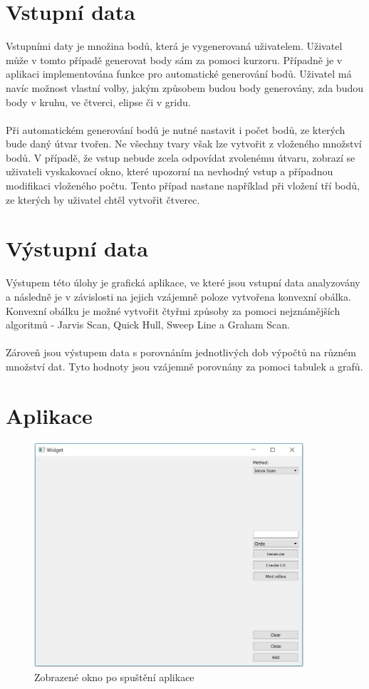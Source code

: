 \documentclass[a4paper, 12pt]{article}
\begin{document}
\section{Vstupní data}
Vstupními daty je množina bodů, která je vygenerovaná uživatelem. Uživatel může v tomto případě generovat body sám za pomoci kurzoru. Případně je v aplikaci implementována funkce pro automatické generování bodů. Uživatel má navíc možnost vlastní volby, jakým způsobem budou body generovány, zda budou body v kruhu, ve čtverci, elipse či v gridu. \\
\\
Při automatickém generování bodů je nutné nastavit i počet bodů, ze kterých bude daný útvar tvořen. Ne všechny tvary však lze vytvořit z vloženého množství bodů. V případě, že vstup nebude zcela odpovídat zvolenému útvaru, zobrazí se uživateli vyskakovací okno, které upozorní na nevhodný vstup a případnou modifikaci vloženého počtu. Tento případ nastane například při vložení tří bodů, ze kterých by uživatel chtěl vytvořit čtverec. 



\section{Výstupní data}
Výstupem této úlohy je grafická aplikace, ve které jsou vstupní data analyzovány a následně je v závislosti na jejich vzájemně poloze vytvořena konvexní obálka. Konvexní obálku je možné vytvořit čtyřmi způsoby za pomoci nejznámějších algoritmů - Jarvis Scan, Quick Hull, Sweep Line a Graham Scan.\\
\\
Zároveň jsou výstupem data s porovnáním jednotlivých dob výpočtů na různém množství dat. Tyto hodnoty jsou vzájemně porovnány za pomoci tabulek a grafů.

\clearpage
\section{Aplikace}
\begin{figure}[h!]
	\centering
	\includegraphics[width=10cm]{vstup.jpg}
	\caption{Zobrazené okno po spuštění aplikace}
\end{figure}
\end{document}
